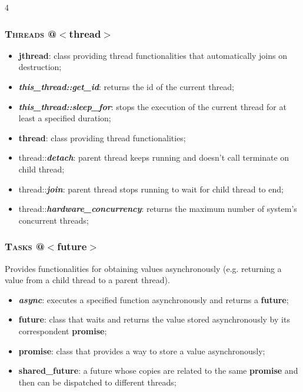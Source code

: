 \documentclass[10pt]{article}
\begin{document}
\begin{multicols*}{4}
{\subsubsection*{\textsc{Threads}  @$<$thread$>$}
\begin{itemize}[leftmargin=*,topsep=0.25pt]
  \setlength\itemsep{-1.8pt}
	\item  {\textbf{jthread}}: class providing thread functionalities that automatically joins on destruction;
	\item  \emph{\textbf{this\_thread::get\_id}}: returns the id of the current thread;
	\item  \emph{\textbf{this\_thread::sleep\_for}}: stops the execution of the current thread for at least a specified duration;
	\item  {\textbf{thread}}: class providing thread functionalities;
  \item  thread::\emph{\textbf{detach}}: parent thread keeps running and doesn't call terminate on child thread;
  \item  thread::\emph{\textbf{join}}: parent thread stops running to wait for child thread to end;
	\item  thread::\emph{\textbf{hardware\_concurrency}}: returns the maximum number of system's concurrent threads;
\end{itemize}

\subsubsection*{\textsc{Tasks}  @$<$future$>$}
\noindent
Provides functionalities for obtaining values asynchronously (e.g. returning a value from a child thread to a parent thread).
\begin{itemize}[leftmargin=*,topsep=0.25pt]
  \setlength\itemsep{-1.8pt}
	\item  \emph{\textbf{async}}: executes a specified function asynchronously and returns a \textbf{future};
	\item  {\textbf{future}}: class that waits and returns the value stored asynchronously by its correspondent \textbf{promise};
	\item  {\textbf{promise}}: class that provides a way to store a value asynchronously;
	\item  {\textbf{shared\_future}}: a future whose copies are related to the same \textbf{promise} and then can be dispatched to different threads;
\end{itemize}

}
\end{multicols*}
\end{document}
